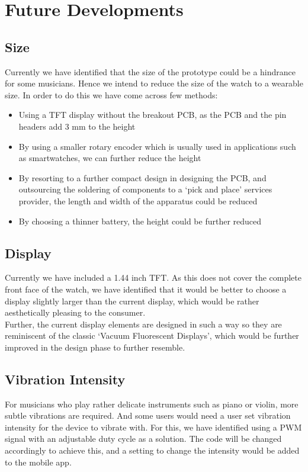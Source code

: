 \documentclass{article}
\begin{document}
        \section{Future Developments}
        \subsection{Size}
        Currently we have identified that the size of the prototype could be a hindrance for some musicians. Hence we intend to reduce the size of the watch to a wearable size. In order to do this we have come across few methods:
        \begin{itemize}
                \item Using a TFT display without the breakout PCB, as the PCB and the pin headers add 3 mm to the height
                \item By using a smaller rotary encoder which is usually used in applications such as smartwatches, we can further reduce the height
                \item By resorting to a further compact design in designing the PCB, and outsourcing the soldering of components to a ‘pick and place’ services provider, the length and width of the apparatus could be reduced
                \item By choosing a thinner battery, the height could be further reduced
        \end{itemize}

        \subsection{Display}
        Currently we have included a 1.44 inch TFT. As this does not cover the complete front face of the watch, we have identified that it would be better to choose a display slightly larger than the current display, which would be rather aesthetically pleasing to the consumer.\\
        Further, the current display elements are designed in such a way so they are reminiscent of the classic ‘Vacuum Fluorescent Displays’, which would be further improved in the design phase to further resemble.

        \subsection{Vibration Intensity}
        For musicians who play rather delicate instruments such as piano or violin, more subtle vibrations are required. And some users would need a user set vibration intensity for the device to vibrate with. For this, we have identified using a PWM signal with an adjustable duty cycle as a solution. The code will be changed accordingly to achieve this, and a setting to change the intensity would be added to the mobile app. 
\end{document}
